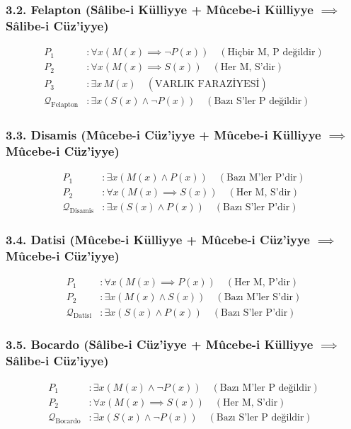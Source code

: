 \documentclass[11pt, a4paper]{article}
\begin{document}
\subsubsection{3.2. Felapton (Sâlibe-i Külliyye + Mûcebe-i Külliyye $\implies$ Sâlibe-i Cüz'iyye)}
\begin{align}
P_1 &: \forall x (M(x) \implies \neg P(x)) \quad (\text{Hiçbir M, P değildir}) \\
P_2 &: \forall x (M(x) \implies S(x)) \quad (\text{Her M, S'dir}) \\
P_3 &: \exists x \, M(x) \quad (\text{VARLIK FARAZİYESİ}) \\
\mathcal{Q}_{\text{Felapton}} &: \exists x (S(x) \land \neg P(x)) \quad (\text{Bazı S'ler P değildir})
\end{align}

\subsubsection{3.3. Disamis (Mûcebe-i Cüz'iyye + Mûcebe-i Külliyye $\implies$ Mûcebe-i Cüz'iyye)}
\begin{align}
P_1 &: \exists x (M(x) \land P(x)) \quad (\text{Bazı M'ler P'dir}) \\
P_2 &: \forall x (M(x) \implies S(x)) \quad (\text{Her M, S'dir}) \\
\mathcal{Q}_{\text{Disamis}} &: \exists x (S(x) \land P(x)) \quad (\text{Bazı S'ler P'dir})
\end{align}

\subsubsection{3.4. Datisi (Mûcebe-i Külliyye + Mûcebe-i Cüz'iyye $\implies$ Mûcebe-i Cüz'iyye)}
\begin{align}
P_1 &: \forall x (M(x) \implies P(x)) \quad (\text{Her M, P'dir}) \\
P_2 &: \exists x (M(x) \land S(x)) \quad (\text{Bazı M'ler S'dir}) \\
\mathcal{Q}_{\text{Datisi}} &: \exists x (S(x) \land P(x)) \quad (\text{Bazı S'ler P'dir})
\end{align}

\subsubsection{3.5. Bocardo (Sâlibe-i Cüz'iyye + Mûcebe-i Külliyye $\implies$ Sâlibe-i Cüz'iyye)}
\begin{align}
P_1 &: \exists x (M(x) \land \neg P(x)) \quad (\text{Bazı M'ler P değildir}) \\
P_2 &: \forall x (M(x) \implies S(x)) \quad (\text{Her M, S'dir}) \\
\mathcal{Q}_{\text{Bocardo}} &: \exists x (S(x) \land \neg P(x)) \quad (\text{Bazı S'ler P değildir})
\end{align}
\end{document}
